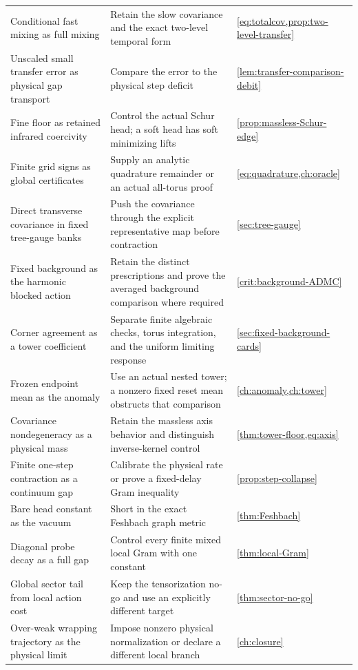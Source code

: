 \documentclass[11pt,oneside,openany]{book}
\theoremstyle{definition}
\theoremstyle{remark}
\begin{document}
\begin{longtable}{L{0.24\textwidth}L{0.49\textwidth}L{0.17\textwidth}}
Conditional fast mixing as full mixing & Retain the slow covariance and the exact two-level temporal form & \cref{eq:totalcov,prop:two-level-transfer} \\
Unscaled small transfer error as physical gap transport & Compare the error to the physical step deficit & \cref{lem:transfer-comparison-debit} \\
Fine floor as retained infrared coercivity & Control the actual Schur head; a soft head has soft minimizing lifts & \cref{prop:massless-Schur-edge} \\
Finite grid signs as global certificates & Supply an analytic quadrature remainder or an actual all-torus proof & \cref{eq:quadrature,ch:oracle} \\
Direct transverse covariance in fixed tree-gauge banks & Push the covariance through the explicit representative map before contraction & \cref{sec:tree-gauge} \\
Fixed background as the harmonic blocked action & Retain the distinct prescriptions and prove the averaged background comparison where required & \cref{crit:background-ADMC} \\
Corner agreement as a tower coefficient & Separate finite algebraic checks, torus integration, and the uniform limiting response & \cref{sec:fixed-background-cards} \\
Frozen endpoint mean as the anomaly & Use an actual nested tower; a nonzero fixed reset mean obstructs that comparison & \cref{ch:anomaly,ch:tower} \\
Covariance nondegeneracy as a physical mass & Retain the massless axis behavior and distinguish inverse-kernel control & \cref{thm:tower-floor,eq:axis} \\
Finite one-step contraction as a continuum gap & Calibrate the physical rate or prove a fixed-delay Gram inequality & \cref{prop:step-collapse} \\
Bare head constant as the vacuum & Short in the exact Feshbach graph metric & \cref{thm:Feshbach} \\
Diagonal probe decay as a full gap & Control every finite mixed local Gram with one constant & \cref{thm:local-Gram} \\
Global sector tail from local action cost & Keep the tensorization no-go and use an explicitly different target & \cref{thm:sector-no-go} \\
Over-weak wrapping trajectory as the physical limit & Impose nonzero physical normalization or declare a different local branch & \cref{ch:closure} \\

\end{longtable}
\end{document}
